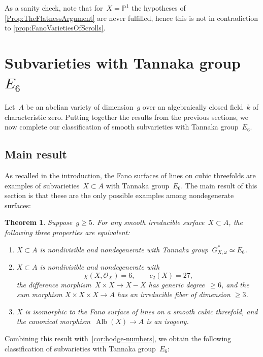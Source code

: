 \documentclass[a4paper]{amsart}
\newcommand{\bbP}{\mathbb{P}}
\newcommand{\cO}{\mathcal{O}}
\DeclareMathOperator{\Alb}{Alb}
\renewcommand{\ge}{\geqslant}
\theoremstyle{plain}
\newtheorem{theorem}{Theorem}[section]
\theoremstyle{definition}
\numberwithin{equation}{section}
\begin{document}
As a sanity check, note that for~$X = \bbP^1$ the hypotheses of \cref{Prop:TheFlatnessArgument} are never fulfilled, hence this is not in contradiction to \cref{prop:FanoVarietiesOfScrolls}.



\section{Subvarieties with Tannaka group \texorpdfstring{$E_6$}{E6}}
\label{sec:proof-of-main-result}


Let~$A$ be an abelian variety of dimension~$g$ over an algebraically closed field~$k$ of characteristic zero. Putting together the results from the previous sections, we now complete our classification of smooth subvarieties with Tannaka group~$E_6$.

\subsection{Main result}
 
As recalled in the introduction, the Fano surfaces of lines on cubic threefolds are examples of subvarieties~$X\subset A$ with Tannaka group~$E_6$. The main result of this section is that these are the only possible examples among nondegenerate surfaces:

\begin{theorem} \label{Thm:E6SurfaceIsFanoSurface} Suppose~$g \ge 5$. For any smooth irreducible surface~$X \subset A$, the following three properties are equivalent:\smallskip
\begin{enumerate}
\item $X\subset A$ is nondivisible and nondegenerate with Tannaka group~$G_{X,\omega}^\ast \simeq E_6$.\smallskip
\item $X\subset A$ is nondivisible and nondegenerate with 
%
\[ \chi(X, \cO_X)=6, \qquad c_2(X)= 27,\]
the difference morphism~$ X\times X \to X-X$ has generic degree~$\ge 6$, and the sum morphism $X \times X \times X \to A$ has an irreducible fiber of dimension $\ge 3$.
\smallskip
\item $X$ is isomorphic to the Fano surface of lines on a smooth cubic threefold, and the canonical morphism~$\Alb(X) \to A$ is an isogeny. \smallskip
\end{enumerate}
\end{theorem}


Combining this result with~\cref{cor:hodge-numbers}, we obtain the following classification of subvarieties with Tannaka group~$E_6$:
\end{document}
